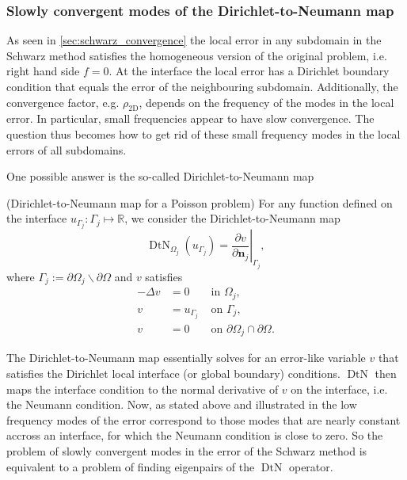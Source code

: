 \subsubsection{Slowly convergent modes of the Dirichlet-to-Neumann map}
As seen in \cref{sec:schwarz_convergence} the local error in any subdomain in the Schwarz method satisfies the homogeneous version of the original problem, i.e. right hand side $f = 0$. At the interface the local error has a Dirichlet boundary condition that equals the error of the neighbouring subdomain. Additionally, the convergence factor, e.g. $\rho_{\text{2D}}$, depends on the frequency of the modes in the local error. In particular, small frequencies appear to have slow convergence. The question thus becomes how to get rid of these small frequency modes in the local errors of all subdomains.

One possible answer is the so-called Dirichlet-to-Neumann map \cite[Definition 5.1]{schwarz_methods_Dolean_2015}
\begin{definition}
    (Dirichlet-to-Neumann map for a Poisson problem) For any function defined on the interface $u_{\Gamma_j}: \Gamma_j \mapsto \mathbb{R}$, we consider the Dirichlet-to-Neumann map
    \[
        \operatorname{DtN}_{\Omega_j}\left(u_{\Gamma_j}\right)=\left.\frac{\partial v}{\partial \mathbf{n}_j}\right|_{\Gamma_j},
    \]
    where $\Gamma_j:=\partial \Omega_j \backslash \partial \Omega$ and $v$ satisfies
    \begin{equation}
        \begin{array}{ccc}
            -\Delta v & =0            & \text { in } \Omega_j,                                \\
            v         & =u_{\Gamma_j} & \text { on } \Gamma_j,                                \\
            v         & =0            & \text { on } \partial \Omega_j \cap \partial \Omega .
        \end{array}
        \label{eq:dirichlet_to_neumann_map_subproblem}
    \end{equation}
    \label{def:dirichlet_to_neumann_map}
\end{definition}

The Dirichlet-to-Neumann map essentially solves for an error-like variable $v$ that satisfies the Dirichlet local interface (or global boundary) conditions. $\operatorname{DtN}$ then maps the interface condition to the normal derivative of $v$ on the interface, i.e. the Neumann condition. Now, as stated above and illustrated in \cite[Figure 5.2]{schwarz_methods_Dolean_2015} the low frequency modes of the error correspond to those modes that are nearly constant accross an interface, for which the Neumann condition is close to zero. So the problem of slowly convergent modes in the error of the Schwarz method is equivalent to a problem of finding eigenpairs of the $\operatorname{DtN}$ operator.


